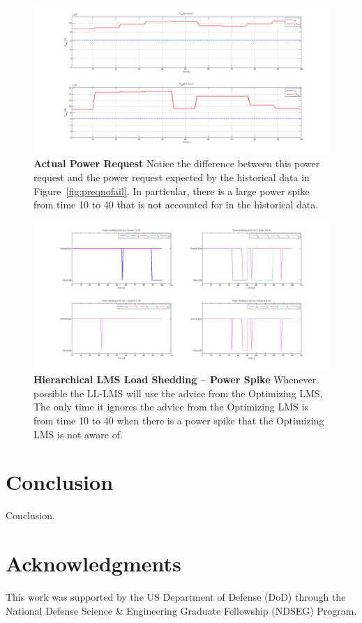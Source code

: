 \documentclass{acm_proc_article-sp}
\begin{document}
\begin{figure}[ht]
  \centering
  \includegraphics[width=0.9\columnwidth]{figures/preqpwrspike.png}
  \caption{\textbf{Actual Power Request} Notice the difference between this power
  request and the power request expected by the historical data in 
  Figure~\ref{fig:preqnofail}. In particular, there is a large power spike from time 10
  to 40 that is not accounted for in the historical data.}
  \label{fig:preqpwrspike}
\end{figure}
\begin{figure}[ht]
  \centering
  \includegraphics[width=0.9\columnwidth]{figures/lsolonefail.png}
  \caption{\textbf{Hierarchical LMS Load Shedding -- Power Spike} Whenever possible the LL-LMS will
  use the advice from the Optimizing LMS. The only time it ignores the advice from the Optimizing LMS is
  from time 10 to 40 when there is a power spike that the Optimizing LMS is not aware of.}
  \label{fig:lsolpwrspike}
\end{figure}

\section{Conclusion}
Conclusion.

\section*{Acknowledgments}
This work was supported by the US Department of Defense (DoD) through the National Defense Science \& Engineering Graduate Fellowship (NDSEG) Program.


 
\end{document}
